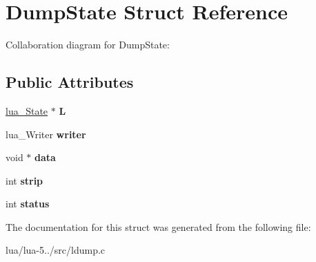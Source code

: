 \hypertarget{struct_dump_state}{\section{Dump\+State Struct Reference}
\label{struct_dump_state}
}


Collaboration diagram for Dump\+State\+:
\subsection*{Public Attributes}
\begin{DoxyCompactItemize}
\item 
\hypertarget{struct_dump_state_ac4aa62a665e8687596f6b6a4e0e77c18}{\hyperlink{structlua___state}{lua\+\_\+\+State} $\ast$ {\bfseries L}}\label{struct_dump_state_ac4aa62a665e8687596f6b6a4e0e77c18}

\item 
\hypertarget{struct_dump_state_ac92b1985689ee766e53540b21702e7dc}{lua\+\_\+\+Writer {\bfseries writer}}\label{struct_dump_state_ac92b1985689ee766e53540b21702e7dc}

\item 
\hypertarget{struct_dump_state_a93fbf2fa246b0b54becb7001b826a1bd}{void $\ast$ {\bfseries data}}\label{struct_dump_state_a93fbf2fa246b0b54becb7001b826a1bd}

\item 
\hypertarget{struct_dump_state_afd4b1bbfc1bd094919b8eca23a268391}{int {\bfseries strip}}\label{struct_dump_state_afd4b1bbfc1bd094919b8eca23a268391}

\item 
\hypertarget{struct_dump_state_a673485f23b723a08f496b001ef8127de}{int {\bfseries status}}\label{struct_dump_state_a673485f23b723a08f496b001ef8127de}

\end{DoxyCompactItemize}


The documentation for this struct was generated from the following file\+:\begin{DoxyCompactItemize}
\item 
lua/lua-\/5../src/ldump.\+c\end{DoxyCompactItemize}
